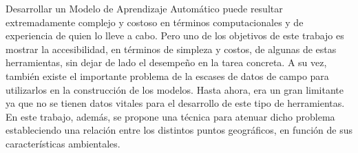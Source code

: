   \par Desarrollar un Modelo de Aprendizaje Automático puede resultar extremadamente
    complejo y costoso en términos computacionales y de experiencia de quien lo lleve
    a cabo. Pero uno de los objetivos de este trabajo es mostrar la accesibilidad,
    en términos de simpleza y costos, de algunas de estas herramientas, sin dejar
    de lado el desempeño en la tarea concreta. A su vez, también existe el importante problema
    de la escases de datos de campo para utilizarlos en la construcción de los modelos.
    Hasta ahora, era un gran limitante ya que no se tienen datos vitales
    para el desarrollo de este tipo de herramientas. En este trabajo, además, se
    propone una técnica para atenuar dicho problema estableciendo una relación
    entre los distintos puntos geográficos, en función de sus características ambientales.


%
